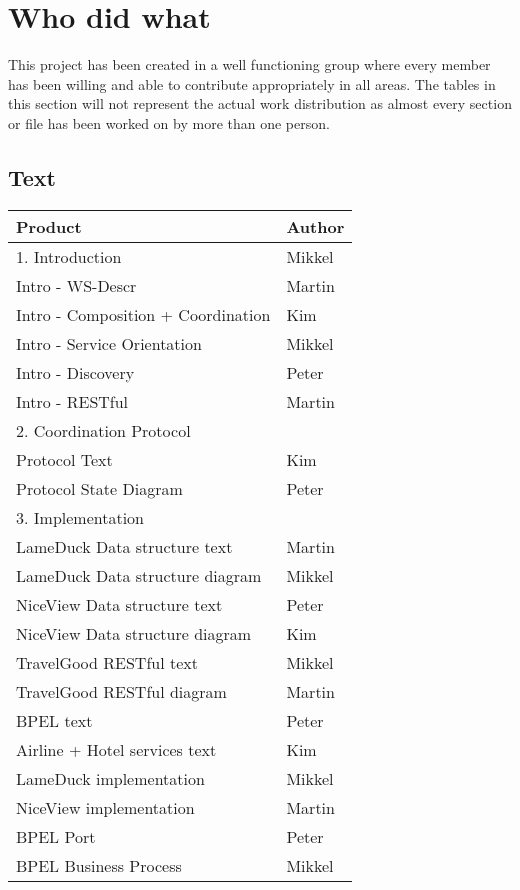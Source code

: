 \chapter{Who did what}

This project has been created in a well functioning group where every member has been willing and able to contribute appropriately in all areas. The tables in this section will not represent the actual work distribution as almost every section or file has been worked on by more than one person.
\section{Text}
\begin{tabular}{|l|l|}
\hline \textbf{Product} & \textbf{Author} \\ \hline
\hline 1. Introduction & Mikkel \\ 
\hline Intro - WS-Descr & Martin \\ 
\hline Intro - Composition + Coordination & Kim \\
\hline Intro - Service Orientation & Mikkel \\ 
\hline Intro - Discovery & Peter  \\ 
\hline Intro - RESTful & Martin  \\ 
\hline 2. Coordination Protocol &  \\ 
\hline Protocol Text & Kim \\ 
\hline Protocol State Diagram & Peter \\ 
\hline 3. Implementation &  \\ 
\hline LameDuck Data structure text & Martin \\ 
\hline LameDuck Data structure diagram & Mikkel \\ 
\hline NiceView Data structure text & Peter  \\ 
\hline NiceView Data structure diagram & Kim \\ 
\hline TravelGood RESTful text & Mikkel \\ 
\hline TravelGood RESTful diagram & Martin  \\ 
\hline BPEL text & Peter \\ 
\hline Airline + Hotel services text & Kim  \\ 
\hline LameDuck implementation & Mikkel \\ 
\hline NiceView implementation & Martin \\ 
\hline BPEL Port & Peter \\ 
\hline BPEL Business Process & Mikkel  \\ 

\end{tabular}

